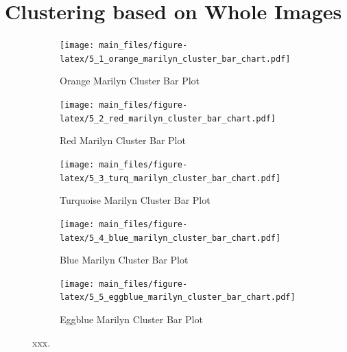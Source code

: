 \documentclass{article}
\begin{document}
\hypertarget{clustering-based-on-whole-images}{%
\section{Clustering based on Whole
Images}\label{clustering-based-on-whole-images}}

\begin{figure}[ht]
  \centering
  \begin{subfigure}{0.3\textwidth}
    \centering
    \texttt{[image: main\_files/figure-latex/5\_1\_orange\_marilyn\_cluster\_bar\_chart.pdf]}
    \caption{Orange Marilyn Cluster Bar Plot}
    \label{fig:6_1_orange_marilyn_cluster_bar_chart}
  \end{subfigure}
  \hfill
  \begin{subfigure}{0.3\textwidth}
    \centering
    \texttt{[image: main\_files/figure-latex/5\_2\_red\_marilyn\_cluster\_bar\_chart.pdf]}
    \caption{Red Marilyn Cluster Bar Plot}
    \label{fig:6_2_red_marilyn_cluster_bar_chart}
  \end{subfigure}
  \hfill
  \begin{subfigure}{0.3\textwidth}
    \centering
    \texttt{[image: main\_files/figure-latex/5\_3\_turq\_marilyn\_cluster\_bar\_chart.pdf]}
    \caption{Turquoise Marilyn Cluster Bar Plot}
    \label{fig:6_3_turq_marilyn_cluster_bar_chart}
  \end{subfigure}

  \vspace{1em}

  \begin{minipage}{0.6\textwidth}
    \centering
    \begin{subfigure}{0.45\textwidth}
      \centering
      \texttt{[image: main\_files/figure-latex/5\_4\_blue\_marilyn\_cluster\_bar\_chart.pdf]}
      \caption{Blue Marilyn Cluster Bar Plot}
      \label{fig:6_4_orange_marilyn_cluster_bar_chart}
    \end{subfigure}
    \hfill
    \begin{subfigure}{0.45\textwidth}
      \centering
      \texttt{[image: main\_files/figure-latex/5\_5\_eggblue\_marilyn\_cluster\_bar\_chart.pdf]}
      \caption{Eggblue Marilyn Cluster Bar Plot}
      \label{fig:6_5_eggblue_marilyn_cluster_bar_chart}
    \end{subfigure}
  \end{minipage}
  \caption{xxx.}
  \label{fig:marilyn_cluster_bars}
\end{figure}
\end{document}
